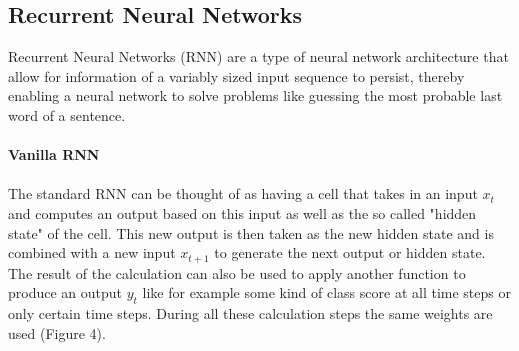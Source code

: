 \documentclass{article}
\begin{document}
\subsection{Recurrent Neural Networks}
Recurrent Neural Networks (RNN) are a type of neural network architecture that allow for information of a variably sized input sequence to persist, thereby enabling a neural network to solve problems like guessing the most probable last word of a sentence.\\\\
\textbf{Vanilla RNN}\\\\
The standard RNN can be thought of as having a cell that takes in an input \(x_t\) and computes an output based on this input as well as the so called "hidden state" of the cell. This new output is then taken as the new hidden state and is combined with a new input \(x_{t+1}\) to generate the next output or hidden state. The result of the calculation can also be used to apply another function to produce an output \(y_t\) like for example some kind of class score at all time steps or only certain time steps. During all these calculation steps the same weights are used (Figure 4).
\end{document}

